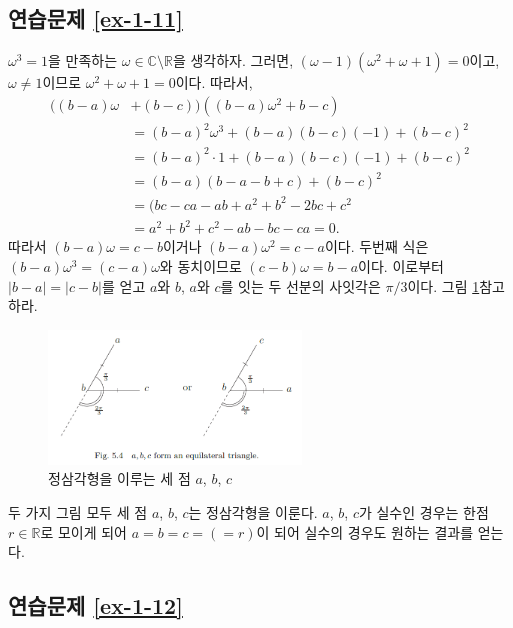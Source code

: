 \subsection*{연습문제 \ref{ex-1-11}}

$\omega^3=1$을 만족하는 $\omega\in\mathbb C \setminus \mathbb R$을 생각하자.
그러면, $(\omega-1)(\omega^2+\omega+1)=0$이고,
$\omega\ne1$이므로 $\omega^2+\omega+1=0$이다.
따라서,
\begin{align*}
((b-a)\omega &+(b-c))((b-a)\omega^2+b-c) \\
&= (b-a)^2\omega^3 + (b-a)(b-c)(-1) + (b-c)^2 \\
&= (b-a)^2\cdot 1 + (b-a)(b-c)(-1)  + (b-c)^2 \\
&= (b-a)(b-a-b+c) + (b-c)^2 \\
&=(bc-ca-ab+a^2+b^2-2bc+c^2 \\
&= a^2+b^2+c^2 -ab - bc - ca = 0.
\end{align*}
따라서 $(b-a)\omega = c-b$이거나 $(b-a)\omega^2 = c-a$이다.
두번째 식은 $(b-a)\omega^3 = (c-a)\omega$와 동치이므로
$(c-b)\omega = b-a$이다.
이로부터 $|b-a|=|c-b|$를 얻고
$a$와 $b$, $a$와 $c$를 잇는 두 선분의 사잇각은 $\pi/3$이다.
그림 \ref{fig-5-4}\를 참고하라.

\begin{figure}[h!]
\begin{center}
\includegraphics[width=0.6\textwidth]{./figs/fig-5-4}
\end{center}
\caption{정삼각형을 이루는 세 점 $a$, $b$, $c$}
\label{fig-5-4}
\end{figure}

두 가지 그림 모두 세 점 $a$, $b$, $c$는 정삼각형을 이룬다.
 $a$, $b$, $c$가 실수인 경우는 한점 $r\in\mathbb R$로 모이게 되어
 $a=b=c=(=r)$이 되어 실수의 경우도 원하는 결과를 얻는다.

\subsection*{연습문제 \ref{ex-1-12}}

